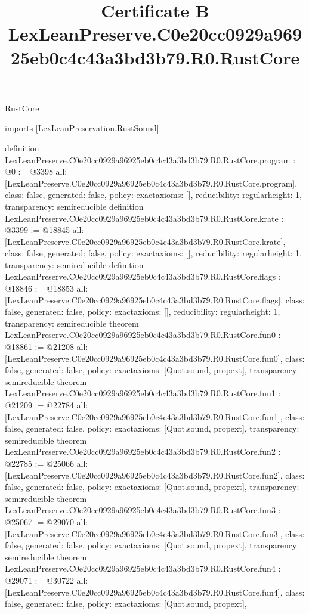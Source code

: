 \begin{lexlean}{RustCore}
\title{Certificate B LexLeanPreserve.C0e20cc0929a96925eb0c4c43a3bd3b79.R0.RustCore}
\begin{coremodule}
imports [LexLeanPreservation.RustSound]

definition LexLeanPreserve.C0e20cc0929a96925eb0c4c43a3bd3b79.R0.RustCore.program : @0 := @3398 {
  all: [LexLeanPreserve.C0e20cc0929a96925eb0c4c43a3bd3b79.R0.RustCore.program],
  class: false,
  generated: false,
  policy: exact{axioms: []},
  reducibility: regular{height: 1},
  transparency: semireducible
}
definition LexLeanPreserve.C0e20cc0929a96925eb0c4c43a3bd3b79.R0.RustCore.krate : @3399 := @18845 {
  all: [LexLeanPreserve.C0e20cc0929a96925eb0c4c43a3bd3b79.R0.RustCore.krate],
  class: false,
  generated: false,
  policy: exact{axioms: []},
  reducibility: regular{height: 1},
  transparency: semireducible
}
definition LexLeanPreserve.C0e20cc0929a96925eb0c4c43a3bd3b79.R0.RustCore.flags : @18846 := @18853 {
  all: [LexLeanPreserve.C0e20cc0929a96925eb0c4c43a3bd3b79.R0.RustCore.flags],
  class: false,
  generated: false,
  policy: exact{axioms: []},
  reducibility: regular{height: 1},
  transparency: semireducible
}
theorem LexLeanPreserve.C0e20cc0929a96925eb0c4c43a3bd3b79.R0.RustCore.fun0 : @18861 := @21208 {
  all: [LexLeanPreserve.C0e20cc0929a96925eb0c4c43a3bd3b79.R0.RustCore.fun0],
  class: false,
  generated: false,
  policy: exact{axioms: [Quot.sound, propext]},
  transparency: semireducible
}
theorem LexLeanPreserve.C0e20cc0929a96925eb0c4c43a3bd3b79.R0.RustCore.fun1 : @21209 := @22784 {
  all: [LexLeanPreserve.C0e20cc0929a96925eb0c4c43a3bd3b79.R0.RustCore.fun1],
  class: false,
  generated: false,
  policy: exact{axioms: [Quot.sound, propext]},
  transparency: semireducible
}
theorem LexLeanPreserve.C0e20cc0929a96925eb0c4c43a3bd3b79.R0.RustCore.fun2 : @22785 := @25066 {
  all: [LexLeanPreserve.C0e20cc0929a96925eb0c4c43a3bd3b79.R0.RustCore.fun2],
  class: false,
  generated: false,
  policy: exact{axioms: [Quot.sound, propext]},
  transparency: semireducible
}
theorem LexLeanPreserve.C0e20cc0929a96925eb0c4c43a3bd3b79.R0.RustCore.fun3 : @25067 := @29070 {
  all: [LexLeanPreserve.C0e20cc0929a96925eb0c4c43a3bd3b79.R0.RustCore.fun3],
  class: false,
  generated: false,
  policy: exact{axioms: [Quot.sound, propext]},
  transparency: semireducible
}
theorem LexLeanPreserve.C0e20cc0929a96925eb0c4c43a3bd3b79.R0.RustCore.fun4 : @29071 := @30722 {
  all: [LexLeanPreserve.C0e20cc0929a96925eb0c4c43a3bd3b79.R0.RustCore.fun4],
  class: false,
  generated: false,
  policy: exact{axioms: [Quot.sound, propext]},
}
\end{coremodule}
\end{lexlean}
